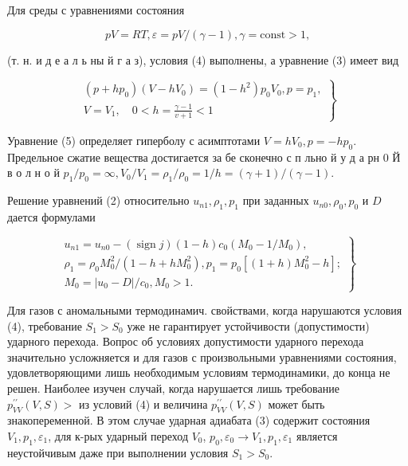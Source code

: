 \documentclass[10pt]{article}
\begin{document}
Для среды с уравнениями состояния



\[

p V=R T, \varepsilon=p V /(\gamma-1), \gamma=\mathrm{const}>1,

\]



(т. н. и д е а л ь ны й г а з), условия (4) выполнены, а уравнение (3) имеет вид



\[

\left.\begin{array}{l}

\left(p+h p_{0}\right)\left(V-h V_{0}\right)=\left(1-h^{2}\right) p_{0} V_{0}, p=p_{1}, \\

V=V_{1}, \quad 0<h=\frac{\gamma-1}{v+1}<1

\end{array}\right\}

\]



Уравнение (5) определяет гиперболу с асимптотами $V=h V_{0}, p=-h p_{0}$. Предельное сжатие вещества достигается за бе сконечно с п льно й у д а рн 0 Й в $о$ л н $о$ й $p_{1} / p_{0}=\infty, V_{0} / V_{1}=\rho_{1} / \rho_{0}=1 / h=(\gamma+1) /(\gamma-1)$.



Решение уравнений (2) относительно $u_{n 1}, \rho_{1}, p_{1}$ при заданных $u_{n 0}, \rho_{0}, p_{0}$ и $D$ дается формулами



\[

\left.\begin{array}{l}

u_{n 1}=u_{n 0}-(\operatorname{sign} j)(1-h) c_{0}\left(M_{0}-1 / M_{0}\right), \\

\rho_{1}=\rho_{0} M_{0}^{2} /\left(1-h+h M_{0}^{2}\right), p_{1}=p_{0}\left[(1+h) M_{0}^{2}-h\right] ; \\

M_{0}=\left|u_{0}-D\right| / c_{0}, M_{0}>1 .

\end{array}\right\}

\]



Для газов с аномальными термодинамич. свойствами, когда нарушаются условия (4), требование $S_{1}>S_{0}$ уже не гарантирует устойчивости (допустимости) ударного перехода. Вопрос об условиях допустимости ударного перехода значительно усложняется и для газов с произвольными уравнениями состояния, удовлетворяющими лишь необходимым условиям термодинамики, до конца не решен. Наиболее изучен случай, когда нарушается лишь требование $p_{V V}^{\prime \prime}(V, S)>$ из условий (4) и величина $p_{V V}^{\prime \prime}(V, S)$ может быть знакопеременной. В этом случае ударная адиабата (3) содержит состояния $V_{1}, p_{1}, \varepsilon_{1}$, для к-рых ударный переход $V_{0}$, $p_{0}, \varepsilon_{0} \rightarrow V_{1}, p_{1}, \varepsilon_{1}$ является неустойчивым даже при выполнении условия $S_{1}>S_{0}$.
\end{document}
